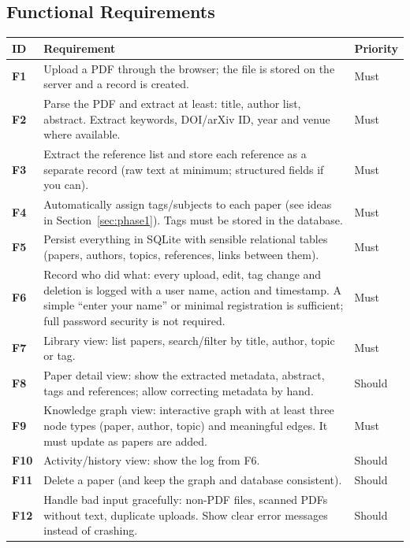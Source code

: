 \documentclass[11pt,a4paper]{article}
\begin{document}
\subsection{Functional Requirements}
\begin{tabularx}{\textwidth}{@{}>{\bfseries}p{1cm}L p{2.2cm}@{}}
\toprule
\textbf{ID} & \textbf{Requirement} & \textbf{Priority}\\
\midrule
F1 & Upload a PDF through the browser; the file is stored on the server and a record is created. & Must\\
F2 & Parse the PDF and extract at least: title, author list, abstract. Extract keywords, DOI/arXiv ID, year and venue where available. & Must\\
F3 & Extract the reference list and store each reference as a separate record (raw text at minimum; structured fields if you can). & Must\\
F4 & Automatically assign tags/subjects to each paper (see ideas in Section~\ref{sec:phase1}). Tags must be stored in the database. & Must\\
F5 & Persist everything in SQLite with sensible relational tables (papers, authors, topics, references, links between them). & Must\\
F6 & Record who did what: every upload, edit, tag change and deletion is logged with a user name, action and timestamp. A simple ``enter your name'' or minimal registration is sufficient; full password security is not required. & Must\\
F7 & Library view: list papers, search/filter by title, author, topic or tag. & Must\\
F8 & Paper detail view: show the extracted metadata, abstract, tags and references; allow correcting metadata by hand. & Should\\
F9 & Knowledge graph view: interactive graph with at least three node types (paper, author, topic) and meaningful edges. It must update as papers are added. & Must\\
F10 & Activity/history view: show the log from F6. & Should\\
F11 & Delete a paper (and keep the graph and database consistent). & Should\\
F12 & Handle bad input gracefully: non-PDF files, scanned PDFs without text, duplicate uploads. Show clear error messages instead of crashing. & Should\\
\bottomrule
\end{tabularx}
\end{document}
